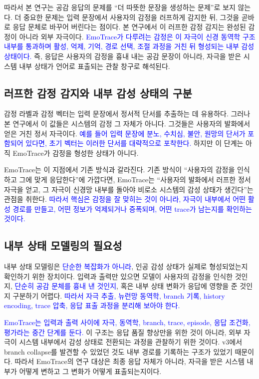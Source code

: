 ﻿\documentclass[11pt,a4paper]{article}
\begin{document}
따라서 본 연구는 공감 응답의 문제를 ``더 따뜻한 문장을 생성하는 문제''로 보지 않는다. 더 중요한 문제는 입력 문장에서 사용자의 감정을 러프하게 감지한 뒤, 그것을 곧바로 응답 문체로 바꾸어 버린다는 점이다. 본 연구에서 이 러프한 감정 감지는 완성된 감정이 아니라 외부 자극이다. \textcolor{blue}{EmoTrace가 다루려는 감정은 이 자극이 신경 동역학 구조 내부를 통과하며 활성, 억제, 기억, 경로 선택, 조절 과정을 거친 뒤 형성되는 내부 감성 상태이다.} 즉, 응답은 사용자의 감정을 흉내 내는 공감 문장이 아니라, 자극을 받은 시스템 내부 상태가 언어로 표출되는 관찰 창구로 해석된다.

\subsection{러프한 감정 감지와 내부 감성 상태의 구분}

감정 라벨과 감정 벡터는 입력 문장에서 정서적 단서를 추출하는 데 유용하다. 그러나 본 연구에서 이 값들은 시스템의 감정 그 자체가 아니다. 그것들은 사용자의 발화에서 얻은 거친 정서 자극이다. \textcolor{blue}{\textcolor{blue}{예를 들어} 입력 문장에 분노, 수치심, 불안, 원망의 단서가 포함되어 있다면, 초기 벡터는 이러한 단서를 대략적으로 포착한다.} 하지만 이 단계는 아직 EmoTrace가 감정을 형성한 상태가 아니다.

EmoTrace는 이 지점에서 기존 방식과 갈라진다. 기존 방식이 ``사용자의 감정을 인식하고 그에 맞게 응답한다''에 가깝다면, EmoTrace는 ``사용자의 발화에서 러프한 정서 자극을 얻고, 그 자극이 신경망 내부를 돌아야 비로소 시스템의 감성 상태가 생긴다''는 관점을 취한다. \textcolor{blue}{따라서 핵심은 감정을 잘 맞히는 것이 아니라, 자극이 내부에서 어떤 활성 경로를 만들고, 어떤 정보가 억제되거나 증폭되며, 어떤 trace가 남는지를 확인하는 것이다.}

\subsection{내부 상태 모델링의 필요성}

내부 상태 모델링은 \textcolor{blue}{단순한 복잡화가 아니라}, 인공 감성 상태가 실제로 형성되었는지 확인하기 위한 장치이다. 입력과 출력만 있으면 모델이 사용자의 감정을 인식한 것인지, \textcolor{blue}{단순히 공감 문체를 흉내 낸 것인지}, 혹은 내부 상태 변화가 응답에 영향을 준 것인지 구분하기 어렵다. \textcolor{blue}{따라서 자극 추출, 뉴런망 동역학, branch 기록, history encoding, trace 압축, 응답 표출 과정을 분리해 보아야 한다.}

\textcolor{blue}{EmoTrace는 입력과 출력 사이에 자극, 동역학, branch, trace, episode, 응답 조건화, 평가라는 중간 단계를 둔다.} 이 구조는 응답 품질 향상만을 위한 것이 아니라, 외부 자극이 시스템 내부에서 감성 상태로 전환되는 과정을 관찰하기 위한 것이다. v3에서 branch collapse를 발견할 수 있었던 것도 내부 경로를 기록하는 구조가 있었기 때문이다. 따라서 EmoTrace의 연구 대상은 최종 응답 자체가 아니라, 자극을 받은 시스템 내부가 어떻게 변하고 그 변화가 어떻게 표출되는지이다.
\end{document}
